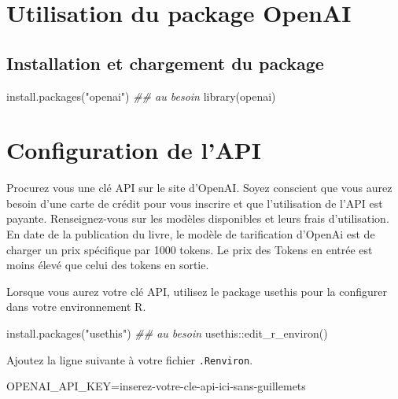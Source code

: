 \documentclass[
  letterpaper,
  DIV=11,
  numbers=noendperiod]{scrreprt}
\newenvironment{Shaded}{\begin{snugshade}}{\end{snugshade}}
\newcommand{\DocumentationTok}[1]{\textcolor[rgb]{0.37,0.37,0.37}{\textit{#1}}}
\newcommand{\FunctionTok}[1]{\textcolor[rgb]{0.28,0.35,0.67}{#1}}
\newcommand{\NormalTok}[1]{\textcolor[rgb]{0.00,0.23,0.31}{#1}}
\newcommand{\OtherTok}[1]{\textcolor[rgb]{0.00,0.23,0.31}{#1}}
\newcommand{\SpecialCharTok}[1]{\textcolor[rgb]{0.37,0.37,0.37}{#1}}
\newcommand{\StringTok}[1]{\textcolor[rgb]{0.13,0.47,0.30}{#1}}
\begin{document}
\section{Utilisation du package
OpenAI}\label{utilisation-du-package-openai}

\subsection{Installation et chargement du
package}\label{installation-et-chargement-du-package}

\begin{Shaded}
\begin{Highlighting}[]
\FunctionTok{install.packages}\NormalTok{(}\StringTok{"openai"}\NormalTok{) }\DocumentationTok{\#\# au besoin}
\FunctionTok{library}\NormalTok{(openai)}
\end{Highlighting}
\end{Shaded}

\section{Configuration de l'API}\label{configuration-de-lapi}

Procurez vous une clé API sur le site d'OpenAI. Soyez conscient que vous
aurez besoin d'une carte de crédit pour vous inscrire et que
l'utilisation de l'API est payante. Renseignez-vous sur les modèles
disponibles et leurs frais d'utilisation. En date de la publication du
livre, le modèle de tarification d'OpenAi est de charger un prix
spécifique par 1000 tokens. Le prix des Tokens en entrée est moins élevé
que celui des tokens en sortie.

Lorsque vous aurez votre clé API, utilisez le package usethis pour la
configurer dans votre environnement R.

\begin{Shaded}
\begin{Highlighting}[]
\FunctionTok{install.packages}\NormalTok{(}\StringTok{"usethis"}\NormalTok{) }\DocumentationTok{\#\# au besoin}
\NormalTok{usethis}\SpecialCharTok{::}\FunctionTok{edit\_r\_environ}\NormalTok{()}
\end{Highlighting}
\end{Shaded}

Ajoutez la ligne suivante à votre fichier \texttt{.Renviron}.

\begin{Shaded}
\begin{Highlighting}[]
\NormalTok{OPENAI\_API\_KEY}\OtherTok{=}\NormalTok{inserez}\SpecialCharTok{{-}}\NormalTok{votre}\SpecialCharTok{{-}}\NormalTok{cle}\SpecialCharTok{{-}}\NormalTok{api}\SpecialCharTok{{-}}\NormalTok{ici}\SpecialCharTok{{-}}\NormalTok{sans}\SpecialCharTok{{-}}\NormalTok{guillemets}
\end{Highlighting}
\end{Shaded}
\end{document}
